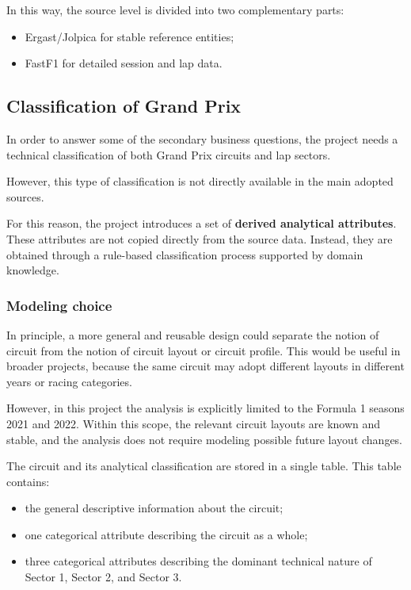\documentclass[12pt,a4paper]{article}
\begin{document}
	In this way, the source level is divided into two complementary parts:
	\begin{itemize}
		\item Ergast/Jolpica for stable reference entities;
		\item FastF1 for detailed session and lap data.
	\end{itemize}
	
	
	\subsection*{Classification of Grand Prix}
	
	In order to answer some of the secondary business questions, the project needs a technical classification of both Grand Prix circuits and lap sectors.
	
	However, this type of classification is not directly available in the main adopted sources.  

	For this reason, the project introduces a set of \textbf{derived analytical attributes}.  
	These attributes are not copied directly from the source data.  
	Instead, they are obtained through a rule-based classification process supported by domain knowledge.

	\subsubsection*{Modeling choice}
	
	In principle, a more general and reusable design could separate the notion of circuit from the notion of circuit layout or circuit profile.  
	This would be useful in broader projects, because the same circuit may adopt different layouts in different years or racing categories.
	
	However, in this project the analysis is explicitly limited to the Formula 1 seasons 2021 and 2022.  
	Within this scope, the relevant circuit layouts are known and stable, and the analysis does not require modeling possible future layout changes.
	
	
	The circuit and its analytical classification are stored in a single table.  
	This table contains:
	\begin{itemize}
		\item the general descriptive information about the circuit;
		\item one categorical attribute describing the circuit as a whole;
		\item three categorical attributes describing the dominant technical nature of Sector 1, Sector 2, and Sector 3.
	\end{itemize}
	
\end{document}
